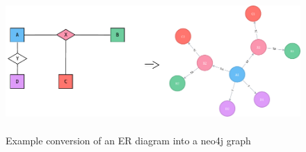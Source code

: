 	\begin{figure}
		\center
		\includegraphics[height=150pt]{resources/er-to-neo4j.pdf}
		\caption{Example conversion of an ER diagram into a neo4j graph}
	
		
		\label{fig:example-er-diagram}
	\end{figure}
	
